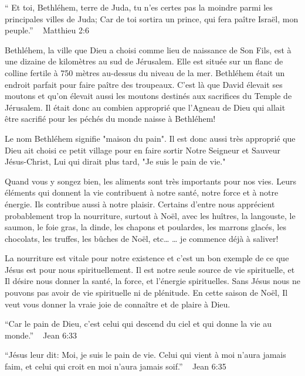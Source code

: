 

“ Et toi, Bethléhem, terre de Juda, tu n’es certes pas la moindre parmi les principales villes de Juda; Car de toi sortira un prince, qui fera paître Israël, mon peuple.”
                                                   ~ Matthieu 2:6

Bethléhem, la ville que Dieu a choisi comme lieu de naissance de Son Fils, est à une dizaine de kilomètres au sud de Jérusalem. Elle est située sur un flanc de colline fertile à 750 mètres au-dessus du niveau de la mer. Bethléhem était un endroit parfait pour faire paître des troupeaux. C'est là que David élevait ses moutons et qu'on élevait aussi les moutons destinés aux sacrifices du Temple de Jérusalem. Il était donc au combien approprié que l'Agneau de Dieu qui allait être sacrifié pour les péchés du monde naisse à Bethléhem!

Le nom Bethléhem signifie "maison du pain". Il est donc aussi très approprié que Dieu ait choisi ce petit village pour en faire sortir Notre Seigneur et Sauveur Jésus-Christ, Lui qui dirait plus tard, "Je suis le pain de vie."

Quand vous y songez bien, les aliments sont très importants pour nos vies. Leurs éléments qui donnent la vie contribuent à notre santé, notre force et à notre énergie. Ils contribue aussi à notre plaisir. Certains d'entre nous apprécient probablement trop la nourriture, surtout à Noël, avec les huîtres, la langouste, le saumon, le foie gras, la dinde, les chapons et poulardes, les marrons glacés, les chocolats, les truffes, les bûches de Noël, etc… … je commence déjà à saliver!

La nourriture est vitale pour notre existence et c'est un bon exemple de ce que Jésus est pour nous spirituellement. Il est notre seule source de vie spirituelle, et Il désire nous donner la santé, la force, et l'énergie spirituelles. Sans Jésus nous ne pouvons pas avoir de vie spirituelle ni de plénitude. En cette saison de Noël, Il veut vous donner la vraie joie de connaître et de plaire à Dieu.

“Car le pain de Dieu, c’est celui qui descend du ciel et qui donne la vie au monde.” ~ Jean 6:33

“Jésus leur dit: Moi, je suis le pain de vie. Celui qui vient à moi n’aura jamais faim, et celui qui croit en moi n’aura jamais soif.” ~ Jean 6:35

